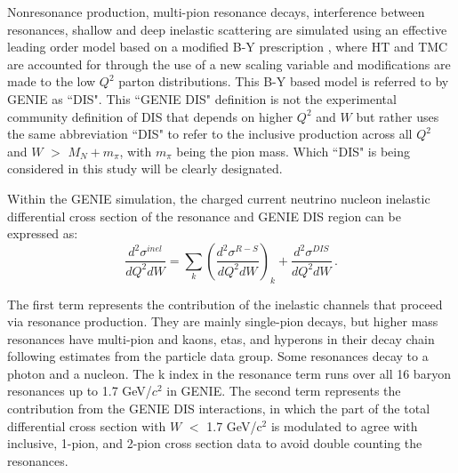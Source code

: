 \documentclass[aps, prd, twocolumn, showpacs, superscriptaddress, floatfix]{revtex4-2}
\begin{document}
Nonresonance production, multi-pion resonance decays, interference between resonances, shallow and deep inelastic scattering are simulated using an effective leading order model based on a modified B-Y prescription \cite{Bodek2003}, where HT and TMC are accounted for through the use of a new scaling variable and modifications are made to the low $Q^2$ parton distributions. This B-Y based model is referred to by GENIE as ``DIS". This ``GENIE DIS" definition is not the experimental community definition of DIS that depends on higher $Q^2$ and $W$ but rather uses the same abbreviation ``DIS" to refer to the inclusive production across all $Q^2$ and $W$ $>$ $M_N + m_\pi$, with $m_\pi$ being the pion mass. Which ``DIS" is being considered in this study will be clearly designated.

Within the GENIE simulation, the charged current neutrino nucleon inelastic differential cross section of the resonance and GENIE DIS region can be expressed as:
\begin{equation}
    \frac{d^2 \sigma^{inel}}{d Q^2 dW} = \sum_k \left(\frac{d^2 \sigma^{R-S}}{d Q^2 dW}\right)_k +  \frac{d^2 \sigma^{DIS}}{d Q^2 dW}\,.
    \label{eq.RESRS}
\end{equation}

The first term represents the contribution of the inelastic channels that proceed via resonance production. They are mainly single-pion decays, but higher mass resonances have multi-pion and kaons, etas, and hyperons in their decay chain following estimates from the particle data group. Some resonances decay to a photon and a nucleon. The k index in the resonance term runs over all 16 baryon resonances up to 1.7 GeV/$c^2$ in GENIE. The second term represents the contribution from the GENIE DIS interactions, in which the part of the total differential cross section with $W$ $<$ 1.7 GeV/c$^2$ is modulated to agree with inclusive, 1-pion, and 2-pion cross section data to avoid double counting the resonances.
\end{document}
